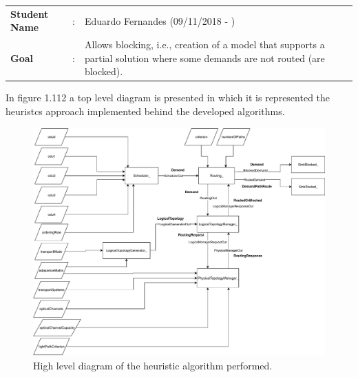 \begin{tcolorbox}	
	\begin{tabular}{p{2.75cm} p{0.2cm} p{10.5cm}} 	
		\textbf{Student Name}   &:& Eduardo Fernandes    (09/11/2018 - )\\
		\textbf{Goal}           &:& Allows blocking, i.e., creation of a model that supports a partial solution where some demands are not routed (are blocked).
	\end{tabular}
\end{tcolorbox}

 \vspace{11pt}
 In figure 1.112 a top level diagram is presented in which it is represented the heuristcs approach implemented behind the developed algorithms. %

\begin{figure}[H]
	\centering
	\includegraphics[width=15cm]{sdf/heuristic/transparent/figures/novoFluxograma}
	\caption{High level diagram of the heuristic algorithm performed.}
	\label{fluxogram_transparent_surv}
\end{figure}



